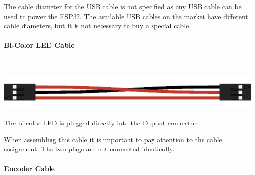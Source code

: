 The cable diameter for the USB cable is not specified as any USB cable can be used to power the ESP32. The available USB cables on the market have different cable diameters, but it is not necessary to buy a special cable.%

\paragraph{Bi-Color LED Cable}\mbox{}\\%

%

\includegraphics[width=\linewidth]{images/DualColorLedCable.jpg}%
{}%

The bi-color LED is plugged directly into the Dupont connector.%

When assembling this cable it is important to pay attention to the cable assignment. The two plugs are not connected identically.%

\clearpage%

\paragraph{Encoder Cable}\mbox{}\\%


